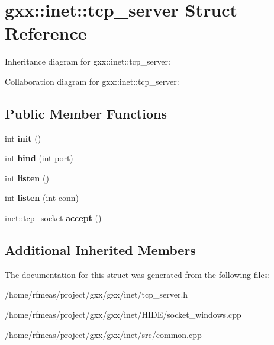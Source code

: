 \hypertarget{structgxx_1_1inet_1_1tcp__server}{}\section{gxx\+:\+:inet\+:\+:tcp\+\_\+server Struct Reference}
\label{structgxx_1_1inet_1_1tcp__server}


Inheritance diagram for gxx\+:\+:inet\+:\+:tcp\+\_\+server\+:


Collaboration diagram for gxx\+:\+:inet\+:\+:tcp\+\_\+server\+:
\subsection*{Public Member Functions}
\begin{DoxyCompactItemize}
\item 
int {\bfseries init} ()\hypertarget{structgxx_1_1inet_1_1tcp__server_a8422f871d8ce8ed31ad15f717225e794}{}\label{structgxx_1_1inet_1_1tcp__server_a8422f871d8ce8ed31ad15f717225e794}

\item 
int {\bfseries bind} (int port)\hypertarget{structgxx_1_1inet_1_1tcp__server_a5c220218575656737bef848534653caf}{}\label{structgxx_1_1inet_1_1tcp__server_a5c220218575656737bef848534653caf}

\item 
int {\bfseries listen} ()\hypertarget{structgxx_1_1inet_1_1tcp__server_acaea51e277f5d516f4d868adcd7c9024}{}\label{structgxx_1_1inet_1_1tcp__server_acaea51e277f5d516f4d868adcd7c9024}

\item 
int {\bfseries listen} (int conn)\hypertarget{structgxx_1_1inet_1_1tcp__server_a693303450ff959596d2344c560ce31b1}{}\label{structgxx_1_1inet_1_1tcp__server_a693303450ff959596d2344c560ce31b1}

\item 
\hyperlink{structgxx_1_1inet_1_1tcp__socket}{inet\+::tcp\+\_\+socket} {\bfseries accept} ()\hypertarget{structgxx_1_1inet_1_1tcp__server_a923d6b47dcb299eef6304c57010333f9}{}\label{structgxx_1_1inet_1_1tcp__server_a923d6b47dcb299eef6304c57010333f9}

\end{DoxyCompactItemize}
\subsection*{Additional Inherited Members}


The documentation for this struct was generated from the following files\+:\begin{DoxyCompactItemize}
\item 
/home/rfmeas/project/gxx/gxx/inet/tcp\+\_\+server.\+h\item 
/home/rfmeas/project/gxx/gxx/inet/\+H\+I\+D\+E/socket\+\_\+windows.\+cpp\item 
/home/rfmeas/project/gxx/gxx/inet/src/common.\+cpp\end{DoxyCompactItemize}
